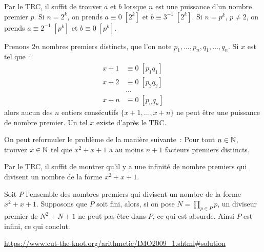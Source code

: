 \begin{sol}
Par le TRC, il suffit de trouver $a$ et $b$ lorsque $n$ est une puissance d'un nombre premier $p$.
Si $n = 2^k$, on prends $a \equiv 0 \; [2^k]$ et $b \equiv 3^{-1} \; [2^k]$.
Si $n = p^k$, $p \ne 2$, on prends $a \equiv 2^{-1} \; [p^k]$ et $b \equiv 0 \; [p^k]$.
\end{sol}

\begin{sol}
Prenons $2n$ nombres premiers distincts, que l'on note $p_1, \dots, p_n, q_1, \dots, q_n$.
Si $x$ est tel que~:
\begin{align*}
x + 1 &\equiv 0 \; [p_1q_1] \\
x + 2 &\equiv 0 \; [p_2q_2] \\
&\dots \\
x + n &\equiv 0 \; [p_nq_n]
\end{align*}
alors aucun des $n$ entiers consécutifs $\{x + 1, \dots, x + n\}$ ne peut être une puissance de nombre premier. Un tel $x$ existe d'après le TRC.
\end{sol}

\begin{sol}
On peut reformuler le problème de la manière suivante~: Pour tout $n \in \mathbb N$, trouvez
$x \in \mathbb N$ tel que $x^2 + x + 1$ a au moins $n + 1$ facteurs premiers distincts.

Par le TRC, il suffit de montrer qu'il y a une infinité de nombre premiers qui divisent un nombre de la forme $x^2 + x + 1$.

Soit $P$ l'ensemble des nombres premiers qui divisent un nombre de la forme $x^2 + x + 1$.
Supposons que $P$ soit fini, alors, si on pose $N = \prod_{p \in P} p$, un diviseur premier de $N^2 + N + 1$ ne peut pas être dans $P$, ce qui est absurde.
Ainsi $P$ est infini, ce qui conclut.
\end{sol}

\begin{sol}
\url{https://www.cut-the-knot.org/arithmetic/IMO2009_1.shtml#solution}
\end{sol}

